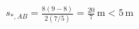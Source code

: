 \documentclass[border=2.5pt]{standalone}
\begin{document}
$\displaystyle s_{*,AB}=\frac{8(9-8)}{2(7/5)}=\frac{20}{7}\,\mathrm m<5\,\mathrm m$
\end{document}
